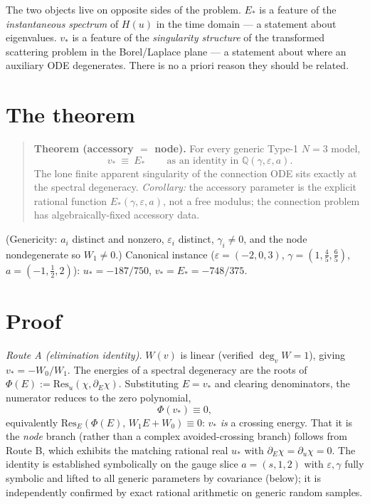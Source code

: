 \documentclass[aps,prl,reprint,nofootinbib,superscriptaddress]{revtex4-2}
\newcommand{\eps}{\varepsilon}
\newcommand{\Z}{\mathbb{Q}}
\newcommand{\Res}{\mathrm{Res}}
\begin{document}
The two objects live on opposite sides of the problem. $E_*$ is a feature of the \emph{instantaneous
spectrum} of $H(u)$ in the time domain --- a statement about eigenvalues. $v_*$ is a feature of the
\emph{singularity structure} of the transformed scattering problem in the Borel/Laplace plane --- a
statement about where an auxiliary ODE degenerates. There is no a priori reason they should be related.

\section{The theorem}
\begin{quote}
\textbf{Theorem (accessory $=$ node).} For every generic Type-1 $N{=}3$ model,
\begin{equation}
\boxed{\,v_*\ \equiv\ E_*\,}\qquad\text{as an identity in }\Z(\gamma,\eps,a).
\end{equation}
The lone finite apparent singularity of the connection ODE sits exactly at the spectral degeneracy.
\emph{Corollary:} the accessory parameter is the explicit rational function $E_*(\gamma,\eps,a)$, not
a free modulus; the connection problem has algebraically-fixed accessory data.
\end{quote}
(Genericity: $a_i$ distinct and nonzero, $\eps_i$ distinct, $\gamma_i\neq0$, and the node nondegenerate
so $W_1\neq0$.) Canonical instance ($\eps=(-2,0,3)$, $\gamma=(1,\tfrac45,\tfrac65)$,
$a=(-1,\tfrac12,2)$): $u_*=-187/750$, $v_*=E_*=-748/375$.

\section{Proof}
\emph{Route A (elimination identity).} $W(v)$ is linear (verified $\deg_v W=1$), giving
$v_*=-W_0/W_1$. The energies of a spectral degeneracy are the roots of
$\Phi(E):=\Res_u(\chi,\partial_E\chi)$. Substituting $E=v_*$ and clearing denominators, the numerator
reduces to the zero polynomial,
\begin{equation}
\Phi(v_*)\equiv0,
\end{equation}
equivalently $\Res_E(\Phi(E),\,W_1E+W_0)\equiv0$: $v_*$ \emph{is} a crossing energy. That it is the
\emph{node} branch (rather than a complex avoided-crossing branch) follows from Route B, which exhibits
the matching rational real $u_*$ with $\partial_E\chi=\partial_u\chi=0$. The identity is established
symbolically on the gauge slice $a=(s,1,2)$ with $\eps,\gamma$ fully symbolic and lifted to all generic
parameters by covariance (below); it is independently confirmed by exact rational arithmetic on
generic random samples.
\end{document}
